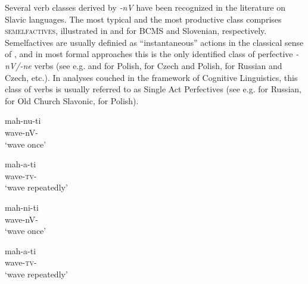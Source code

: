 \documentclass[output=paper,colorlinks,citecolor=brown]{langscibook}
\begin{document}

Several verb classes derived by \textit{-nV} have been recognized in the literature on Slavic languages. The most typical and the most productive class comprises \textsc{semelfactives}, illustrated in  and  for BCMS and Slovenian, respectively. Semelfactives are usually definied as ``instantaneous'' actions in the classical sense of \citet{Smith1997}, and in most formal approaches this is the only identified class of perfective \textit{-nV/-ne} verbs (see e.g. \citealt{sta+:Lazorczyk2010} and \citealt{Kwapiszewski2020, Kwapiszewski2022} for Polish, \citealt{Wiland2019} for Czech and Polish, \citealt{sta+:Biskup2023} for Russian and Czech, etc.). In analyses couched in the framework of Cognitive Linguistics, this class of verbs is usually referred to as Single Act Perfectives (see e.g. \citealt{Janda2007,DickeyJanda2009,MakarovaJanda2009,KuznetsovaMakarova2012,Nesset2013,Sokolova2015} for Russian, \citealt{Nesset2012} for Old Church Slavonic, \citealt{Bacz2012} for Polish).

\begin{multicols}{2}

\ea\label{str:ex:SemItSC}
	\ea  \gll mah-nu-ti \\ 
wave-nV-{\INF} \\
\glt `wave once'\label{str:ex:SemItSC-a} 

\ex  \gll mah-a-ti\\ 
 wave-\textsc{tv}-{\INF}\\ 
\glt `wave repeatedly'\label{str:ex:SemItSC-b} 
				
	\z
\z 
\end{multicols}

\begin{multicols}{2}
    
\ea\label{str:ex:SemItSlo}
	\ea  \gll mah-ni-ti \\ 
wave-nV-{\INF} \\
\glt `wave once'\label{str:ex:SemItSlo-a} 

\ex  \gll mah-a-ti\\ 
 wave-\textsc{tv}-{\INF} \\ 
\glt `wave repeatedly'\label{str:ex:SemItSlo-b} 
				
	\z
\z 
\end{multicols}
\end{document}
